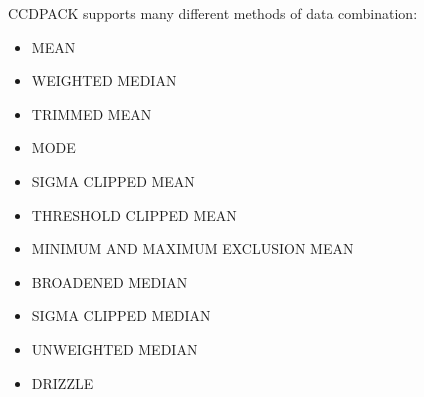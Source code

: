 \documentclass[twoside,11pt]{article}
\renewcommand{\_}{\texttt{\symbol{95}}}
\begin{document}
CCDPACK supports many different methods of data combination:
\begin{itemize}
\item MEAN
\item WEIGHTED MEDIAN
\item TRIMMED MEAN
\item MODE
\item SIGMA CLIPPED MEAN
\item THRESHOLD CLIPPED MEAN
\item MINIMUM AND MAXIMUM EXCLUSION MEAN
\item BROADENED MEDIAN
\item SIGMA CLIPPED MEDIAN
\item UNWEIGHTED MEDIAN
\item DRIZZLE
\end{itemize}
\end{document}
